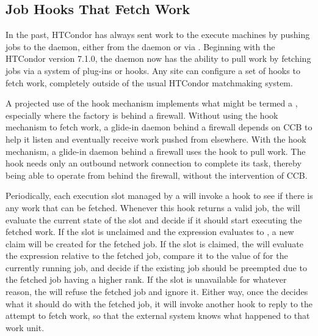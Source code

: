 \subsection{\label{sec:job-hooks}Job Hooks That Fetch Work}

In the past, HTCondor has always sent work to the execute machines by
pushing jobs to the  daemon, either from the 
daemon or via .
Beginning with the HTCondor version 7.1.0, the  daemon now has the
ability to pull work by fetching jobs via a system of plug-ins or
hooks.
Any site can configure a set of hooks to fetch work, completely
outside of the usual HTCondor matchmaking system.

A projected use of the hook mechanism implements what might
be termed a , especially where the
factory is behind a firewall.
Without using the hook mechanism to fetch work,
a glide-in  daemon behind a firewall
depends on CCB to help it listen and eventually receive
work pushed from elsewhere.
With the hook mechanism, a glide-in  daemon
behind a firewall uses the hook to pull work.
The hook needs only an outbound network connection to complete
its task,
thereby being able to operate from behind the firewall,
without the intervention of CCB.

Periodically, each execution slot managed by a  will
invoke a hook to see if there is any work that can be fetched.
Whenever this hook returns a valid job, the  will
evaluate the current state of the slot and decide if it should start
executing the fetched work.
If the slot is unclaimed and the  expression evaluates to
, a new claim will be created for the fetched job.
If the slot is claimed, the  will evaluate the
 expression relative to the fetched job, compare it to
the value of  for the currently running job, and decide
if the existing job should be preempted due to the fetched job having
a higher rank.
If the slot is unavailable for whatever reason, the 
will refuse the fetched job and ignore it.
Either way, once the  decides what it should do with
the fetched job, it will invoke another hook to reply to the attempt
to fetch work, so that the external system knows what happened to that
work unit.

